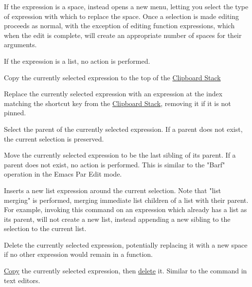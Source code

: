 If the expression is a space, instead opens a new menu,
letting you select the type of expression with which to replace the space. 
Once a selection is made editing proceeds as normal, with the exception of
editing function expressions, which when the edit is complete, will create
an appropriate number of spaces for their arguments.

If the expression is a list, no action is performed.


Copy the currently selected expression to the top of the
\hyperref[soln:clipboard_list]{Clipboard Stack}

Replace the currently selected expression with an expression at the index
matching the shortcut key from the
\hyperref[soln:clipboard_list]{Clipboard Stack}, removing it if it is not
pinned.

Select the parent of the currently selected expression. If a parent does not
exist, the current selection is preserved.

Move the currently selected expression to be the last sibling of its parent.
If a parent does not exist, no action is performed.
This is similar to the "Barf" operation in the Emacs Par Edit mode.


Inserts a new list expression around the current selection. Note that "list
merging" is performed, merging immediate list children of a list with their
parent. For example, invoking this command on an expression
which already has a list as its parent, will not create a new list, instead
appending a new sibling to the selection to the current list.

Delete the currently selected expression, potentially replacing it with a new
space if no other expression would remain in a function.


\hyperref[cmd:copy]{Copy} the currently selected expression, then
\hyperref[cmd:delete]{delete} it. Similar to the  command in
text editors.


